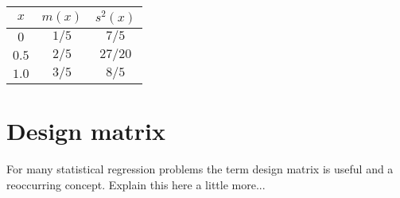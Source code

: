 \documentclass[11pt, DINA4, fleqn]{amsart}
\begin{document}
\begin{center}
	\begin{tabular}{ c c c }
		$x$ & $m(x)$ & $s^2(x)$ \\ \hline
		$0$ & $1/5$ & $7/5$ \\  
		$0.5$ & $2/5$ & $27/20$ \\
		$1.0$ & $3/5$ & $8/5$ \\   
	\end{tabular}
\label{eq:benchmarkTable}
\end{center}

\section{Design matrix}
For many statistical regression problems the term design matrix is useful and a reoccurring concept. Explain this here a little more...
\end{document}

